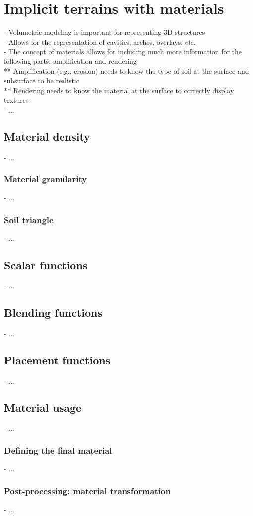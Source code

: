 \section{Implicit terrains with materials}
\label{sec:state-of-the-art_implicit-terrain-with-materials}
- Volumetric modeling is important for representing 3D structures \\
- Allows for the representation of cavities, arches, overlays, etc. \\
- The concept of materials allows for including much more information for the following parts: amplification and rendering \\
** Amplification (e.g., erosion) needs to know the type of soil at the surface and subsurface to be realistic \\
** Rendering needs to know the material at the surface to correctly display textures \\
- ...

\subsection{Material density}
- ...

\subsubsection{Material granularity}
- ...

\subsubsection{Soil triangle}
- ...

\subsection{Scalar functions}
- ...

\subsection{Blending functions}
- ...

\subsection{Placement functions}
- ...

\subsection{Material usage}
- ...

\subsubsection{Defining the final material}
- ...

\subsubsection{Post-processing: material transformation}
- ...
